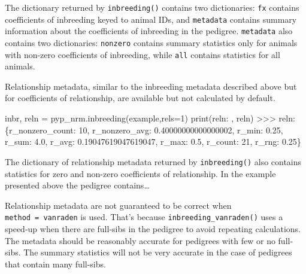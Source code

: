 \documentclass[
  letterpaper,
  DIV=11,
  numbers=noendperiod]{scrreprt}
\newenvironment{Shaded}{\begin{snugshade}}{\end{snugshade}}
\newcommand{\BuiltInTok}[1]{\textcolor[rgb]{0.00,0.23,0.31}{#1}}
\newcommand{\DecValTok}[1]{\textcolor[rgb]{0.68,0.00,0.00}{#1}}
\newcommand{\FloatTok}[1]{\textcolor[rgb]{0.68,0.00,0.00}{#1}}
\newcommand{\NormalTok}[1]{\textcolor[rgb]{0.00,0.23,0.31}{#1}}
\newcommand{\OperatorTok}[1]{\textcolor[rgb]{0.37,0.37,0.37}{#1}}
\newcommand{\StringTok}[1]{\textcolor[rgb]{0.13,0.47,0.30}{#1}}
\begin{document}
The dictionary returned by \texttt{inbreeding()} contains two
dictionaries: \texttt{fx} contains coefficients of inbreeding keyed to
animal IDs, and \texttt{metadata} contains summary information about the
coefficients of inbreeding in the pedigree. \texttt{metadata} also
contains two dictionaries: \texttt{nonzero} contains summary statistics
only for animals with non-zero coefficients of inbreeding, while
\texttt{all} contains statistics for all animals.

Relationship metadata, similar to the inbreeding metadata described
above but for coefficients of relationship, are available but not
calculated by default.

\begin{Shaded}
\begin{Highlighting}[]
\NormalTok{inbr, reln }\OperatorTok{=}\NormalTok{ pyp\_nrm.inbreeding(example,rels}\OperatorTok{=}\DecValTok{1}\NormalTok{)}
\BuiltInTok{print}\NormalTok{(}\StringTok{\textquotesingle{}reln: \textquotesingle{}}\NormalTok{, reln)}
\OperatorTok{\textgreater{}\textgreater{}\textgreater{}}\NormalTok{ reln:  \{}\StringTok{\textquotesingle{}r\_nonzero\_count\textquotesingle{}}\NormalTok{: }\DecValTok{10}\NormalTok{, }\StringTok{\textquotesingle{}r\_nonzero\_avg\textquotesingle{}}\NormalTok{: }\FloatTok{0.40000000000000002}\NormalTok{,}
    \StringTok{\textquotesingle{}r\_min\textquotesingle{}}\NormalTok{: }\FloatTok{0.25}\NormalTok{, }\StringTok{\textquotesingle{}r\_sum\textquotesingle{}}\NormalTok{: }\FloatTok{4.0}\NormalTok{, }\StringTok{\textquotesingle{}r\_avg\textquotesingle{}}\NormalTok{: }\FloatTok{0.19047619047619047}\NormalTok{, }\StringTok{\textquotesingle{}r\_max\textquotesingle{}}\NormalTok{: }\FloatTok{0.5}\NormalTok{,}
    \StringTok{\textquotesingle{}r\_count\textquotesingle{}}\NormalTok{: }\DecValTok{21}\NormalTok{, }\StringTok{\textquotesingle{}r\_rng\textquotesingle{}}\NormalTok{: }\FloatTok{0.25}\NormalTok{\}}
\end{Highlighting}
\end{Shaded}

The dictionary of relationship metadata returned by
\texttt{inbreeding()} also contains statistics for zero and non-zero
coefficients of relationship. In the example presented above the
pedigree contains\ldots{}

Relationship metadata are not guaranteed to be correct when
\texttt{method\ =\ \textquotesingle{}vanraden\textquotesingle{}} is
used. That's because \texttt{inbreeding\_vanraden()} uses a speed-up
when there are full-sibs in the pedigree to avoid repeating
calculations. The metadata should be reasonably accurate for pedigrees
with few or no full-sibs. The summary statistics will not be very
accurate in the case of pedigrees that contain many full-sibs.
\end{document}
